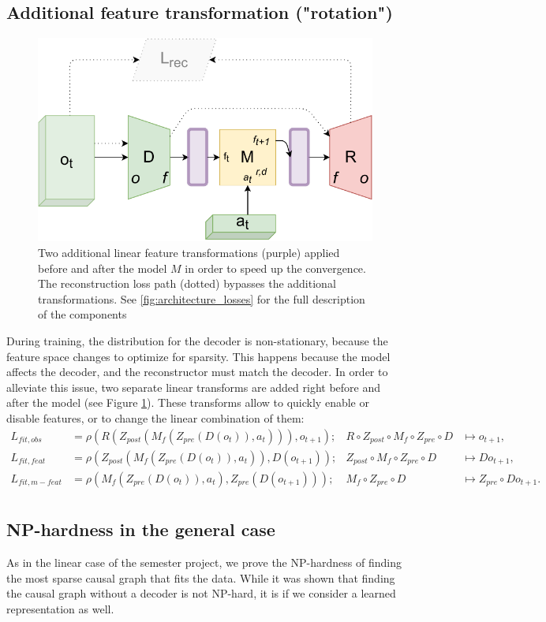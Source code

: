 \documentclass[a4paper,11pt,oneside]{report}
\begin{document}
\subsection{Additional feature transformation ("rotation")}
\begin{figure}[h]
    \centering
    \includegraphics[width=0.7\linewidth]{diagrams/architecture_rotation}
    \caption{Two additional linear feature transformations (purple) applied before and after the model $M$ in order to speed up the convergence. The reconstruction loss path (dotted) bypasses the additional transformations. See \autoref{fig:architecture_losses} for the full description of the components}
    \label{fig:architecture_rotation}
\end{figure}


During training, the distribution for the decoder is non-stationary, because the feature space changes to optimize for sparsity. This happens because the model affects the decoder, and the reconstructor must match the decoder. In order to alleviate this issue, two separate linear transforms are added right before and after the model (see Figure \ref{fig:architecture_rotation}). These transforms allow to quickly enable or disable features, or to change the linear combination of them:
$$
\begin{array}{clll}
L_{fit, obs}&=\rho(R(Z_{post}(M_f(Z_{pre}(D(o_t)),a_t))), o_{t+1});& R\circ Z_{post}\circ M_f \circ Z_{pre}\circ D&\mapsto o_{t+1},\\
L_{fit, feat}&=\rho(Z_{post}(M_f(Z_{pre}(D(o_t)),a_t)), D(o_{t+1}));&Z_{post}\circ M_f\circ Z_{pre}\circ D&\mapsto Do_{t+1},\\
L_{fit, m-feat}&=\rho(M_f(Z_{pre}(D(o_t)),a_t), Z_{pre}(D(o_{t+1})));&M_f\circ Z_{pre}\circ D&\mapsto Z_{pre}\circ Do_{t+1}.\\
\end{array}
$$

\subsection{NP-hardness in the general case}
As in the linear case of the semester project, we prove the NP-hardness of finding the most sparse causal graph that fits the data. While it was shown \cite{Claassen2013} that finding the causal graph without a decoder is not NP-hard, it is if we consider a learned representation as well.
\end{document}
